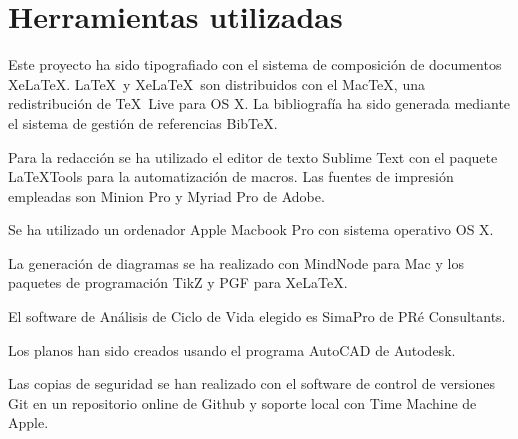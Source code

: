 \chapter{Herramientas utilizadas}\label{apend:herramientas}

Este proyecto ha sido tipografiado con el sistema de composición de documentos Xe\LaTeX. \LaTeX\ y Xe\LaTeX\ son distribuidos con el Mac\TeX, una redistribución de \TeX\ Live para OS X. La bibliografía ha sido generada mediante el sistema de gestión de referencias Bib\TeX.

Para la redacción se ha utilizado el editor de texto Sublime Text con el paquete LaTeXTools para la automatización de macros. Las fuentes de impresión empleadas son Minion Pro y Myriad Pro de Adobe.

Se ha utilizado un ordenador Apple Macbook Pro con sistema operativo OS X.

La generación de diagramas se ha realizado con MindNode para Mac y los paquetes de programación TikZ y PGF para Xe\LaTeX.

El software de Análisis de Ciclo de Vida elegido es SimaPro de PRé Consultants.

Los planos han sido creados usando el programa AutoCAD de Autodesk.

Las copias de seguridad se han realizado con el software de control de versiones Git en un repositorio online de Github y soporte local con Time Machine de Apple.
